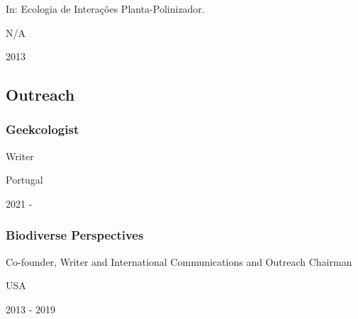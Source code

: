 \documentclass[
]{article}
\begin{document}
In: Ecologia de Interações Planta-Polinizador.

N/A

2013

\hypertarget{outreach}{%
\subsection{Outreach}\label{outreach}}

\hypertarget{geekcologist}{%
\subsubsection{Geekcologist}\label{geekcologist}}

Writer

Portugal

2021 -

\hypertarget{biodiverse-perspectives}{%
\subsubsection{Biodiverse Perspectives}\label{biodiverse-perspectives}}

Co-founder, Writer and International Communications and Outreach
Chairman

USA

2013 - 2019
\end{document}
